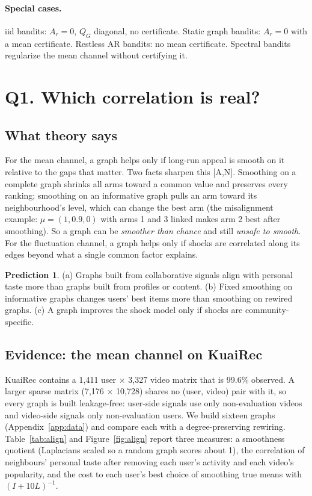 \documentclass[11pt]{article}
\theoremstyle{definition}
\newtheorem{prediction}{Prediction}
\theoremstyle{remark}
\newcommand{\src}[1]{\textsf{[#1]}}
\begin{document}
\paragraph{Special cases.} iid bandits: $A_r=0$, $Q_G$ diagonal, no certificate. Static graph bandits: $A_r=0$ with a mean certificate. Restless AR bandits: no mean certificate. Spectral bandits regularize the mean channel without certifying it.

\section{Q1. Which correlation is real?}\label{sec:q1}

\subsection{What theory says}

For the mean channel, a graph helps only if long-run appeal is smooth on it relative to the gaps that matter. Two facts sharpen this \src{A,N}. Smoothing on a complete graph shrinks all arms toward a common value and preserves every ranking; smoothing on an informative graph pulls an arm toward its neighbourhood's level, which can change the best arm (the misalignment example: $\mu=(1,0.9,0)$ with arms 1 and 3 linked makes arm 2 best after smoothing). So a graph can be \emph{smoother than chance} and still \emph{unsafe to smooth}. For the fluctuation channel, a graph helps only if shocks are correlated along its edges beyond what a single common factor explains.

\begin{prediction}\label{pred:q1}
(a) Graphs built from collaborative signals align with personal taste more than graphs built from profiles or content. (b) Fixed smoothing on informative graphs changes users' best items more than smoothing on rewired graphs. (c) A graph improves the shock model only if shocks are community-specific.
\end{prediction}

\subsection{Evidence: the mean channel on KuaiRec}

KuaiRec contains a 1,411 user $\times$ 3,327 video matrix that is 99.6\% observed. A larger sparse matrix (7,176 $\times$ 10,728) shares no (user, video) pair with it, so every graph is built leakage-free: user-side signals use only non-evaluation videos and video-side signals only non-evaluation users. We build sixteen graphs (Appendix~\ref{app:data}) and compare each with a degree-preserving rewiring. Table~\ref{tab:align} and Figure~\ref{fig:align} report three measures: a smoothness quotient (Laplacians scaled so a random graph scores about 1), the correlation of neighbours' personal taste after removing each user's activity and each video's popularity, and the cost to each user's best choice of smoothing true means with $(I+10L)^{-1}$.
\end{document}
